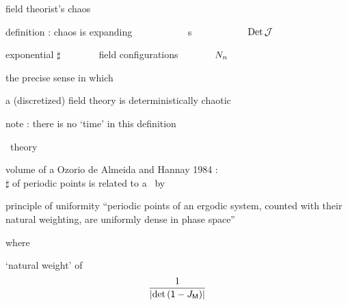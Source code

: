 \begin{frame}{field theorist's chaos}
    \begin{block}{definition : chaos is}
expanding ~~~~~~~~~~~{\color{blue}\HillDet s}
~~~~~~~~~~~$\mbox{\rm Det}\,{\cal J}$

exponential $\sharp$~~~~~~~~{\color{blue}field configurations}
~~~~~~~$N_{n_{}}$~~~
    \end{block}

\bigskip
the precise sense in which

a (discretized) {\color{blue}field theory}
is {\color{blue}deterministically chaotic}

\vfill
 {\color{red}\huge note} : there is
 {\color{red}no} `time' in this definition
\end{frame} %

\begin{frame}{}
\vfill
\begin{center}
{\huge \po\ theory}
\end{center}
\vfill
\end{frame} %

\begin{frame}{volume of a \po}
Ozorio de Almeida and Hannay 1984 :\\
$\sharp$ of periodic points is related to a \JacobianM\ by
\begin{block}{principle of uniformity}
``periodic points of an ergodic system, counted with their natural
weighting, are uniformly dense in phase space''
\end{block}
\bigskip

where
\begin{block}{`natural weight' of \po\ {\Mm}}
\[
  \frac{1}{|\mbox{\rm det}\,(\mathsf{1} - J_{\mathsf{M}})|}
\]
\end{block}
\end{frame} %


